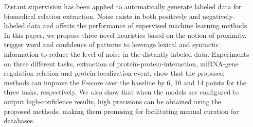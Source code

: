 Distant supervision has been applied to automatically generate labeled data for biomedical relation extraction. Noise exists in both positively and negatively-labeled data and affects the performance of supervised machine learning methods. In this paper, we propose three novel heuristics based on the notion of proximity, trigger word and confidence of patterns to leverage lexical and syntactic information to reduce the level of noise in the distantly labeled data. Experiments on three different tasks, extraction of protein-protein-interaction, miRNA-gene regulation relation and protein-localization event, show that the proposed methods can improve the F-score over the baseline by 6, 10 and 14 points for the three tasks, respectively. We also show that when the models are configured to output high-confidence results, high precisions can be obtained using the proposed methods, making them promising for facilitating manual curation for databases.
